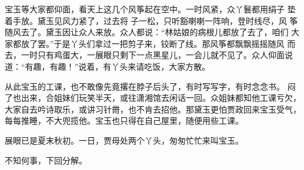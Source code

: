 宝玉等大家都仰面，看天上这几个风筝起在空中。一时风紧，众丫鬟都用绢子
垫着手放。黛玉见风力紧了，过去将子一松，只听豁喇喇一阵响，登时线尽，风
筝随风去了。黛玉因让众人来放。众人都说：“林姑娘的病根儿都放了去了，咱们
大家都放了罢。”于是丫头们拿过一把剪子来，铰断了线。那风筝都飘飘摇摇随风
而去，一时只有鸡蛋大，一展眼只剩下一点黑星儿，一会儿就不见了。众人仰面说
道：“有趣，有趣！”说着，有丫头来请吃饭，大家方散。

从此宝玉的工课，也不敢像先竟撂在脖子后头了，有时写写字，有时念念书。
闷了也出来，合姐妹们玩笑半天，或往潇湘馆去闲话一回。众姐妹都知他工课亏欠，
大家自去吟诗取乐，或讲习针黹，也不肯去招他。那黛玉更怕贾政回来宝玉受气，
每每推睡，不大兜揽他。宝玉也只得在自己屋里，随便用些工课。

展眼已是夏末秋初。一日，贾母处两个丫头，匆匆忙忙来叫宝玉。

不知何事，下回分解。